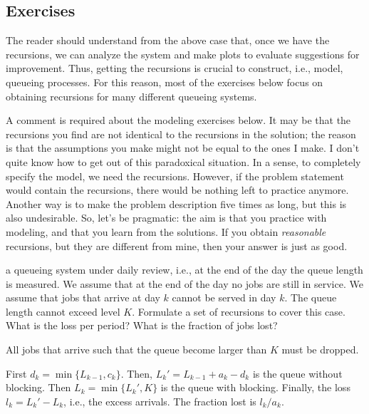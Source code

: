 \subsection*{Exercises}
\label{sec:exercises-1}


The reader should understand from the above case that, once we have
the recursions, we can analyze the system and make plots to evaluate
suggestions for improvement.  Thus, getting the recursions is crucial
to construct, i.e., model, queueing processes. For this reason, most
of the exercises below focus on obtaining recursions for many
different queueing systems. 

A comment is required about the modeling exercises below. It may be
that the recursions you find are not identical to the recursions in
the solution; the reason is that the assumptions you make might not be
equal to the ones I make. I don't quite know how to get out of this
paradoxical situation.  In a sense, to completely specify the model,
we need the recursions. However, if the problem statement would
contain the recursions, there would be nothing left to practice
anymore. Another way is to make the problem description five times as
long, but this is also undesirable. So, let's be pragmatic: the aim is
that you practice with modeling, and that you learn from the
solutions.  If you obtain \emph{reasonable} recursions, but they are
different from mine, then your answer is just as good.

\begin{exercise} a queueing system
  under daily review, i.e., at the end of the day the queue length is
  measured. We assume that at the end of the day no jobs are still in
  service. We assume that jobs that arrive at day $k$ cannot be served
  in day $k$. The queue length cannot exceed level $K$.  Formulate a
  set of recursions to cover this case. What is the loss per period? What is the fraction of jobs lost?
  \begin{solution}

    All jobs that arrive such that the queue become larger than $K$
    must be dropped. 

First $d_k = \min\{L_{k-1}, c_k\}$. Then, $L_k' = L_{k-1}+a_k-d_k$ is the queue without blocking. Then $L_k=\min\{L_k', K\}$ is the queue with blocking. Finally, the loss $l_k=L_k'-L_k$, i.e., the excess arrivals. The fraction lost is $l_k/a_k$. 
  \end{solution}
\end{exercise}

